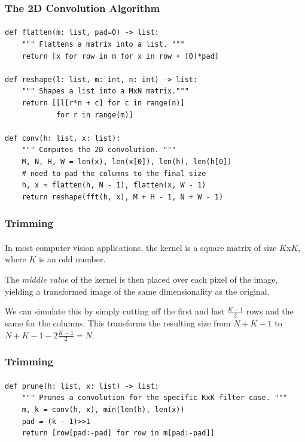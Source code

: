 \documentclass[11pt,handout]{beamer}             %
\begin{document}
\begin{frame}[fragile]
\frametitle{The 2D Convolution Algorithm}
\framesubtitle{}
\begin{verbatim}
def flatten(m: list, pad=0) -> list:
    """ Flattens a matrix into a list. """
    return [x for row in m for x in row + [0]*pad]

def reshape(l: list, m: int, n: int) -> list:
    """ Shapes a list into a MxN matrix."""
    return [[l[r*n + c] for c in range(n)]
            for r in range(m)]

def conv(h: list, x: list):
    """ Computes the 2D convolution. """
    M, N, H, W = len(x), len(x[0]), len(h), len(h[0])
    # need to pad the columns to the final size
    h, x = flatten(h, N - 1), flatten(x, W - 1)
    return reshape(fft(h, x), M + H - 1, N + W - 1)
\end{verbatim}
\end{frame}

\begin{frame}
\frametitle{Trimming}
\framesubtitle{}
In most computer vision applications, the kernel is a square matrix
of size \( K \)x\( K \), where \( K \) is an odd number. \pause

The \textit{middle value} of the kernel is then placed over each pixel of the
image, yielding a transformed image of the same dimensionality as the original.
\pause

We can simulate this by simply cutting off the first and last
\( \frac{K - 1}{2} \) rows and the same for the columns.
This transforms the resulting size from \( N + K - 1 \) to
\( N + K - 1 - 2 \frac{K - 1}{2} = N \).
\end{frame}

\begin{frame}[fragile]
\frametitle{Trimming}
\framesubtitle{}
\begin{verbatim}
def prune(h: list, x: list) -> list:
    """ Prunes a convolution for the specific KxK filter case. """
    m, k = conv(h, x), min(len(h), len(x))
    pad = (k - 1)>>1
    return [row[pad:-pad] for row in m[pad:-pad]]
\end{verbatim}
\end{frame}
\end{document}
